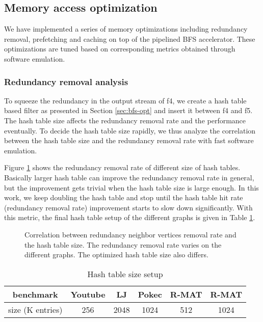 \subsection{Memory access optimization}
We have implemented a series of memory optimizations including 
redundancy removal, prefetching and caching on top of the pipelined 
BFS accelerator. These optimizations are tuned 
based on corresponding metrics obtained through software emulation. 

\subsubsection{Redundancy removal analysis} 
To squeeze the redundancy in the output stream of f4, we create a hash table based 
filter as presented in Section \ref{sec:bfs-opt} and insert it between f4 and f5. 
The hash table size affects the redundancy removal rate and the performance eventually.
To decide the hash table size rapidly, we thus analyze the correlation 
between the hash table size and the redundancy removal rate with 
fast software emulation. 

Figure \ref{fig:hash-redundancy} shows the 
redundancy removal rate of different size of hash tables. Basically larger hash table 
can improve the redundancy removal rate in general, but the improvement gets trivial 
when the hash table size is large enough. In this work, we keep doubling the hash table and stop 
until the hash table hit rate (redundancy removal rate) improvement starts to slow down significantly. 
With this metric, the final hash table setup of the different graphs is given in 
Table \ref{tab:hash-size}.

\begin{figure}
    \caption{Correlation between redundancy neighbor vertices removal rate and the hash table size. 
    The redundancy removal rate varies on the different graphs. The optimized hash table size also 
    differs.}
\label{fig:hash-redundancy}
\end{figure}

\begin{table}
    \centering
  \caption{Hash table size setup}
  \label{tab:hash-size}
  \begin{tabular}{cccccc}
    \toprule
      benchmark & Youtube & LJ & Pokec & R-MAT\uppercase\expandafter{\romannumeral1} 
      & R-MAT\uppercase\expandafter{\romannumeral2} \\
    \midrule
      size (K entries) & 256 & 2048 & 1024 & 512 & 1024 \\
  \bottomrule
\end{tabular}
\end{table}

